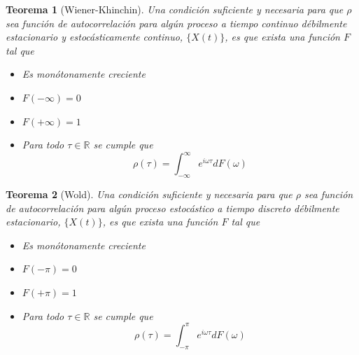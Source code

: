 \documentclass{beamer}
\newtheorem{thrm}{Teorema}
\newcommand{\R}{\mathbb{R}}
\newcommand{\intR}{\int_{-\infty}^{\infty}}
\newcommand{\intPI}{\int_{-\pi}^{\pi}}
\begin{document}

\begin{frame}%
\begin{thrm}[Wiener-Khinchin]
Una condici\'on suficiente y necesaria para que
$\rho$ sea funci\'on de autocorrelaci\'on para alg\'un proceso a tiempo continuo d\'ebilmente 
estacionario y estoc\'asticamente continuo, $\{X(t)\}$,  es que exista una funci\'on $F$ tal que
\begin{itemize}
\item Es mon\'otonamente creciente
\item $F(-\infty) = 0$
\item $F(+\infty) = 1$
\item Para todo $\tau \in \R$ se cumple que
\begin{equation*}
\rho(\tau) = \intR e^{i \omega \tau} dF(\omega)
\end{equation*}
\end{itemize}
\end{thrm}
\end{frame}


\begin{frame}%
\begin{thrm}[Wold]
Una condici\'on suficiente y necesaria para que $\rho$ sea funci\'on de autocorrelaci\'on para
alg\'un proceso estoc\'astico a tiempo discreto d\'ebilmente estacionario, $\{X(t)\}$, es que exista 
una funci\'on $F$ tal que
\begin{itemize}
\item Es mon\'otonamente creciente
\item $F(-\pi) = 0$
\item $F(+\pi) = 1$
\item Para todo $\tau \in \R$ se cumple que
\begin{equation*}
\rho(\tau) = \intPI e^{i \omega \tau} dF(\omega)
\end{equation*}
\end{itemize}
\end{thrm}
\end{frame}

\end{document}
